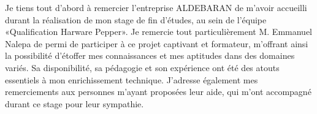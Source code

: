 Je tiens tout d’abord à remercier l’entreprise ALDEBARAN de m’avoir accueilli durant la réalisation de mon stage de fin d'études, au sein de l'équipe «Qualification Harware Pepper».
Je remercie tout particulièrement M. Emmanuel Nalepa de permi de participer à ce projet captivant et formateur, m’offrant ainsi la possibilité d'étoffer mes connaissances et mes aptitudes dans des domaines variés. Sa disponibilité, sa pédagogie et son expérience ont été des atouts essentiels à mon enrichissement technique.
J’adresse également mes remerciements aux personnes m'ayant proposées leur aide, qui m’ont accompagné durant ce stage pour leur sympathie.